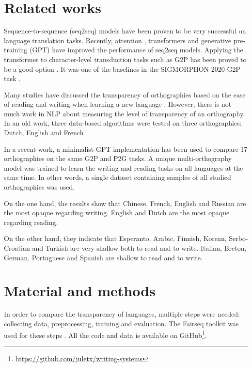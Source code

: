 \documentclass[11pt,a4paper]{article}
\begin{document}
\section{Related works}

Sequence-to-sequence (seq2seq) models have been proven to be very successful on language translation tasks. Recently, attention \cite{bahdanau2016neural}, transformers \cite{vaswani2017attention} and generative pre-training (GPT) \cite{Radford2018ImprovingLU} have improved the performance of seq2seq models. Applying the transformer to character-level transduction tasks such as G2P has been proved to be a good option \cite{wu2021applying}. It was one of the baselines in the SIGMORPHON 2020 G2P task \cite{gorman-etal-2020-sigmorphon}.

Many studies have discussed the transparency of orthographies based on the ease of reading and writing when learning a new language \cite{borleffs2017measuring}. However, there is not much work in NLP about measuring the level of transparency of an orthography. In an old work, three data-based algorithms were tested on three orthographies: Dutch, English and French \cite{bosch-1994-depth}.

In a recent work, a minimalist GPT implementation has been used to compare 17 orthographies \cite{marjou2021oteann} on the same G2P and P2G tasks. A unique multi-orthography model was trained to learn the writing and reading tasks on all languages at the same time. In other words, a single dataset containing samples of all studied orthographies was used.

On the one hand, the results show that Chinese, French, English and Russian are the most opaque regarding writing. English and Dutch are the most opaque regarding reading. 

On the other hand, they indicate that Esperanto, Arabic, Finnish, Korean, Serbo-Croatian and Turkish are very shallow both to read and to write. Italian, Breton, German, Portuguese and Spanish are shallow to read and to write.

\section{Material and methods}

In order to compare the transparency of languages, multiple steps were needed: collecting data, preprocessing, training and evaluation. The Fairseq toolkit was used for these steps \cite{ott2019fairseq}. All the code and data is available on GitHub\footnote{\url{https://github.com/juletx/writing-systems}}.
\end{document}
